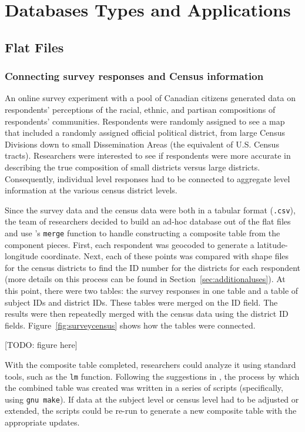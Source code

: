 \documentclass[]{article}
\begin{document}
\section{Databases Types and Applications}

\subsection{Flat Files}

\subsubsection{Connecting survey responses and Census information}

An online survey experiment with a pool of Canadian citizens
generated data on respondents' perceptions of the racial, ethnic, and partisan
compositions of respondents' communities. Respondents were randomly assigned
to see a map that included a randomly assigned official political district,
from large Census Divisions down to small Dissemination Areas (the equivalent
of U.S. Census tracts). Researchers were interested to see if respondents were
more accurate in describing the true composition of small districts versus
large districts. Consequently, individual level responses had to be connected
to aggregate level information at the various census district levels.

Since the survey data and the census
data were both in a tabular format (\texttt{.csv}), the team of researchers
decided to build an ad-hoc database out of the flat files and use \R's
\texttt{merge} function to handle constructing a composite table from the
component pieces. First, each respondent was geocoded to generate a
latitude-longitude coordinate. Next, each of these points was compared with
shape files for the census districts to find the ID number for the districts
for each respondent (more details on this process can be found in
Section~\ref{sec:additionaluses}). At this point, there were two tables: the
survey responses in one table and a table of subject IDs and district IDs.
These tables were merged on the ID field. The results were then repeatedly
merged with the census data using the district ID fields.
Figure~\ref{fig:surveycensus} shows how the tables were connected.

[TODO: figure here]

With the composite table completed, researchers could analyze it using
standard \R tools, such as the \texttt{lm} function. Following the suggestions
in \citet{Fredrickson:2010fk}, the process by which the combined table was
created was written in a series of scripts (specifically, using \texttt{gnu
make}). If data at the subject level or census level had to be adjusted or
extended, the scripts could be re-run to generate a new composite table with
the appropriate updates.
\end{document}
